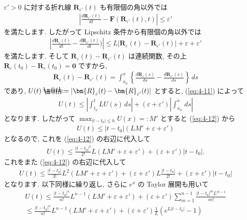 \documentclass[openany, a4paper, oneside]{book}
\makeatletter
\newcommand*{\defeq}{\mathrel{\rlap{%
\raisebox{0.3ex}{$\m@th\cdot$}}%
\raisebox{-0.3ex}{$\m@th\cdot$}}%
=}
\theoremstyle{break}
\theoremstyle{breakdefn}
\newcommand{\abs}[1]{\left|#1\right|}
\newcommand{\vep}{\varepsilon}
\makeatother
\begin{document}
$\vep ' >0$ に対する折れ線 $\bm{R}_{\vep '}(t)$ も有限個の角以外では
\begin{gather}
\left | \frac{ d \bm{R}_{\vep '} ( t ) } {dt} - \bm{F} ( \bm{R}_{\vep '} (t) , t )  \right|
\leq
\vep '
\label{eq:4-10}
\end{gather}
を満たします.
したがって Lipschitz 条件から有限個の角以外では
\begin{gather}
\left | \frac{d \bm{R}_{ \vep } (t) } {dt} - \frac{d \bm{R}_{ \vep '} (t) } {dt} ) \right|
\leq
L | \bm{R}_{\vep} (t) - \bm{R}_{\vep '} (t) | + \vep + \vep '
\label{eq:4-11}
\end{gather}
を満たします.
そして $\bm{R}_{\vep} (t) - \bm{R}_{\vep '} (t)$ は連続関数,
その上 $\bm{R}_{\vep} (t_0) - \bm{R}_{\vep} (t_0) = \bm{0}$ ですから,
\begin{gather}
\bm{R}_{\vep} (t) - \bm{R}_{\vep '} (t)
=
\int_{x_0}^x \left \{   \frac{d \bm{R}_{ \vep } (s) } {ds} - \frac{d \bm{R}_{ \vep '} (s) } {ds} \right \} \, ds
\end{gather}
であり, $U (t) \defeq | \bm{R}_{\vep} (t) - \bm{R}_{\vep '} (t) |$ とすると, (\ref{eq:4-11}) によって
\begin{gather}
 U (t)
 \leq
 \left| \int_{t_0}^t L U (s) \, ds \right|
 +( \vep + \vep ' ) \left| \int_{x_0}^x \, ds \right|
\label{eq:4-12}
\end{gather}
となります.
したがって $\max_{ | t - t_0 | \leq h } U (x) =: M'$ とすると (\ref{eq:4-12}) から
\begin{gather}
 U (t)
 \leq
 \abs{t - t_0}( LM' + \vep + \vep ' )
\end{gather}
となるので, これを (\ref{eq:4-12}) の右辺に代入して
\begin{gather}
 U (t)
 \leq
 \frac{ | t - t_0 |^2 } {2!} L ( LM' + \vep + \vep ' ) + ( \vep + \vep ' )| t - t_0 |.
\end{gather}
これをまた (\ref{eq:4-12}) の右辺に代入して
\begin{gather}
 U (t)
 \leq
 \frac{| t - t_0 |} {3!} L^2 ( LM' + \vep + \vep ' )
 +( \vep + \vep ' ) L \frac{| t - t_0 |} {2!}
 +( \vep + \vep ' ) | t - t_0 |
\end{gather}
となります.
以下同様に繰り返し, さらに $e^x$ の Taylor 展開も用いて
\begin{gather}
 U (t)
 \leq
 \frac{| t - t_0 |^n} {n!}L^{n-1} ( LM' + \vep + \vep ' )
 +( \vep + \vep ' ) \sum_{m=1}^{n-1} \frac{ | t - t_0 |^m L^{m-1} } {m!} \\
 \leq
 \frac{| t - t_0 |^n} {n!}L^{n-1} ( LM' + \vep + \vep ' )
 +( \vep + \vep ' ) \frac{1} {L} \left ( e^{ L | t - t_0 | } - 1 \right)
\end{gather}
\end{document}
